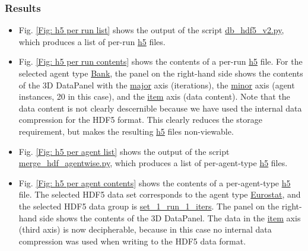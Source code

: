 \documentclass[10pt,a4paper]{article}
\begin{document}
\subsubsection{Results}

\begin{itemize}
\item Fig. \ref{Fig: h5 per run list} shows the output of the script \url{db_hdf5_v2.py}, which produces a list of per-run \url{h5} files.

\item Fig. \ref{Fig: h5 per run contents} shows the contents of a per-run \url{h5} file. For the selected agent type \url{Bank}, the panel on the right-hand side shows the contents of the 3D DataPanel with the \url{major} axis (iterations), the \url{minor} axis (agent instances, 20 in this case), and the \url{item} axis (data content). Note that the data content is not clearly descernible because we have used the internal data compression for the HDF5 format. This clearly reduces the storage requirement, but makes the resulting \url{h5} files non-viewable.

\item Fig. \ref{Fig: h5 per agent list} shows the output of the script \url{merge_hdf_agentwise.py}, which produces a list of per-agent-type \url{h5} files.

\item Fig. \ref{Fig: h5 per agent contents} shows the contents of a per-agent-type \url{h5} file. The selected HDF5 data set corresponds to the agent type \url{Eurostat}, and the selected HDF5 data group is \url{set_1_run_1_iters}. The panel on the right-hand side shows the contents of the 3D DataPanel. The data in the \url{item} axis (third axis) is now decipherable, because in this case no internal data compression was used when writing to the HDF5 data format.
\end{itemize}
\end{document}
